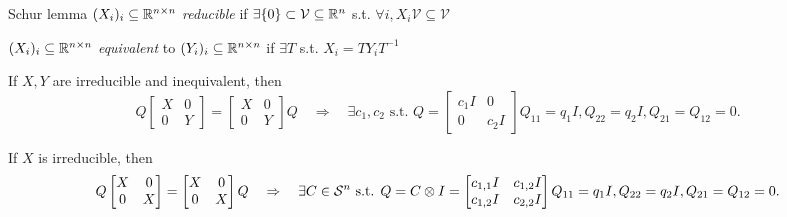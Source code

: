 \begin{frame}{Schur lemma}
  \noindent$(X_i)_i\subseteq \mathbb{R}^{n \times n}$ \emph{reducible} if $\exists \{0\} \subset \mathcal{V} \subseteq \mathbb{R}^n$ s.t. $\forall i, X_i \mathcal{V} \subseteq \mathcal{V}$

  \noindent$(X_i)_i\subseteq \mathbb{R}^{n \times n}$ \emph{equivalent} to $(Y_i)_i\subseteq \mathbb{R}^{n \times n}$ if $\exists T$ s.t. $X_i = TY_iT^{-1}$

  If $X, Y$ are irreducible and inequivalent, then
  $$
  Q
  \begin{bmatrix}
    X & 0\\
    0 & Y
  \end{bmatrix}
    =
  \begin{bmatrix}
    X & 0\\
    0 & Y
  \end{bmatrix}
  Q
  \quad
  \Rightarrow
  \quad
  \exists c_1, c_2 \text{ s.t. }
  Q =
  \begin{bmatrix}
    c_1 I & 0\\
    0 & c_2 I
  \end{bmatrix}
   Q_{11} = q_1 I, Q_{22} = q_2 I,
   Q_{21} = Q_{12} = 0.
  $$

  If $X$ is irreducible, then
  $$
  Q
  \begin{bmatrix}
    X & 0\\
    0 & X
  \end{bmatrix}
    =
  \begin{bmatrix}
    X & 0\\
    0 & X
  \end{bmatrix}
  Q
  \quad
  \Rightarrow
  \quad
  \exists C \in \mathcal{S}^n \text{ s.t. }
  Q = C \otimes I =
  \begin{bmatrix}
    c_{1,1}I & c_{1,2}I\\
    c_{1,2}I & c_{2,2}I
  \end{bmatrix}
   Q_{11} = q_1 I, Q_{22} = q_2 I,
   Q_{21} = Q_{12} = 0.
  $$

\end{frame}
